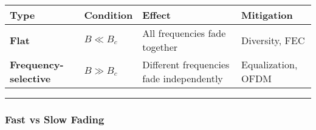 {\def\LTcaptype{} %
\begin{longtable}[]{@{}
  >{\raggedright\arraybackslash}p{}
  >{\raggedright\arraybackslash}p{}
  >{\raggedright\arraybackslash}p{}
  >{\raggedright\arraybackslash}p{}@{}}
\toprule\noalign{}
\begin{minipage}[b]{\linewidth}\raggedright
Type
\end{minipage} & \begin{minipage}[b]{\linewidth}\raggedright
Condition
\end{minipage} & \begin{minipage}[b]{\linewidth}\raggedright
Effect
\end{minipage} & \begin{minipage}[b]{\linewidth}\raggedright
Mitigation
\end{minipage} \\
\midrule\noalign{}
\endhead
\bottomrule\noalign{}
\endlastfoot
\textbf{Flat} & \(B \ll B_c\) & All frequencies fade together &
Diversity, FEC \\
\textbf{Frequency-selective} & \(B \gg B_c\) & Different frequencies
fade independently & Equalization, OFDM \\
\end{longtable}
}

\begin{center}\rule{0.5\linewidth}{0.5pt}\end{center}

\subsubsection{Fast vs Slow Fading}\label{fast-vs-slow-fading}

